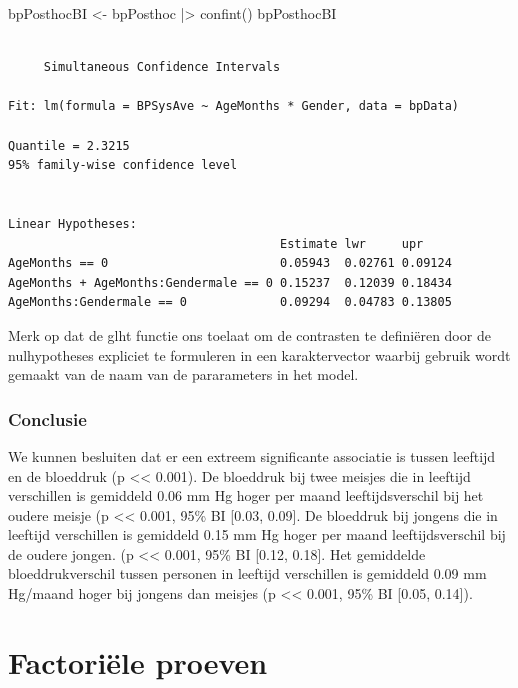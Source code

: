 \documentclass[
  dutch,
  letterpaper,
  12pt]{book}
\newenvironment{Shaded}{\begin{snugshade}}{\end{snugshade}}
\newcommand{\FunctionTok}[1]{\textcolor[rgb]{0.28,0.35,0.67}{#1}}
\newcommand{\NormalTok}[1]{\textcolor[rgb]{0.00,0.23,0.31}{#1}}
\newcommand{\OtherTok}[1]{\textcolor[rgb]{0.00,0.23,0.31}{#1}}
\newcommand{\SpecialCharTok}[1]{\textcolor[rgb]{0.37,0.37,0.37}{#1}}
\theoremstyle{definition}
\theoremstyle{definition}
\theoremstyle{definition}
\theoremstyle{remark}
\begin{document}
\begin{Shaded}
\begin{Highlighting}[]
\NormalTok{bpPosthocBI }\OtherTok{\textless{}{-}}\NormalTok{ bpPosthoc }\SpecialCharTok{|\textgreater{}} \FunctionTok{confint}\NormalTok{()}
\NormalTok{bpPosthocBI}
\end{Highlighting}
\end{Shaded}

\begin{verbatim}

     Simultaneous Confidence Intervals

Fit: lm(formula = BPSysAve ~ AgeMonths * Gender, data = bpData)

Quantile = 2.3215
95% family-wise confidence level
 

Linear Hypotheses:
                                      Estimate lwr     upr    
AgeMonths == 0                        0.05943  0.02761 0.09124
AgeMonths + AgeMonths:Gendermale == 0 0.15237  0.12039 0.18434
AgeMonths:Gendermale == 0             0.09294  0.04783 0.13805
\end{verbatim}

Merk op dat de glht functie ons toelaat om de contrasten te definiëren
door de nulhypotheses expliciet te formuleren in een karaktervector
waarbij gebruik wordt gemaakt van de naam van de pararameters in het
model.

\subsubsection{Conclusie}\label{conclusie-2}

We kunnen besluiten dat er een extreem significante associatie is tussen
leeftijd en de bloeddruk (p \textless\textless{} 0.001). De bloeddruk
bij twee meisjes die in leeftijd verschillen is gemiddeld 0.06 mm Hg
hoger per maand leeftijdsverschil bij het oudere meisje (p
\textless\textless{} 0.001, 95\% BI {[}0.03, 0.09{]}. De bloeddruk bij
jongens die in leeftijd verschillen is gemiddeld 0.15 mm Hg hoger per
maand leeftijdsverschil bij de oudere jongen. (p \textless\textless{}
0.001, 95\% BI {[}0.12, 0.18{]}. Het gemiddelde bloeddrukverschil tussen
personen in leeftijd verschillen is gemiddeld 0.09 mm Hg/maand hoger bij
jongens dan meisjes (p \textless\textless{} 0.001, 95\% BI {[}0.05,
0.14{]}).

\section{Factoriële proeven}\label{factoriuxeble-proeven}
\end{document}
